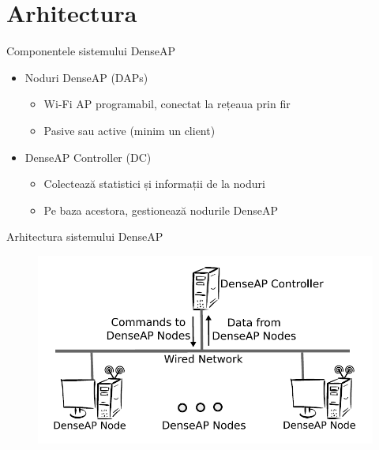 \section{Arhitectura}

\begin{frame}{Componentele sistemului DenseAP}
  \begin{itemize}
    \item Noduri DenseAP (DAPs)
    \begin{itemize}
      \item Wi-Fi AP programabil, conectat la rețeaua prin fir
      \item Pasive sau active (minim un client)
    \end{itemize}
    \pause
    \item DenseAP Controller (DC)
    \begin{itemize}
      \item Colectează statistici și informații de la noduri
      \item Pe baza acestora, gestionează nodurile DenseAP
    \end{itemize}
  \end{itemize}
\end{frame}

\begin{frame}{Arhitectura sistemului DenseAP}
  \begin{figure}
    \includegraphics[scale=0.40]{img/fig1.png}
  \end{figure}
\end{frame}

